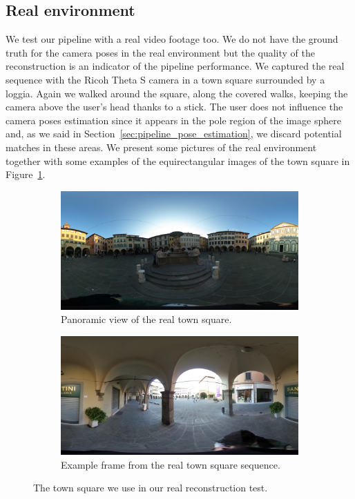 \subsection{Real environment}
We test our pipeline with a real video footage too. We do not have the ground truth
for the camera poses in the real environment but the quality of the
reconstruction is an indicator of the pipeline performance.
We captured the real sequence with the Ricoh Theta S camera in a town square
surrounded by a loggia. Again we walked around the square, along the covered
walks, keeping the camera above the user's head thanks to a stick.
The user does not influence the camera poses estimation since it appears in the
pole region of the image sphere and, as we said in
Section~\ref{sec:pipeline_pose_estimation}, we discard potential matches in
these areas.
We present some pictures of the real environment together with some examples
of the equirectangular images of the town square in
Figure~\ref{fig:piazzaLeoni}.
%
\begin{figure}[h]
\centering
	\begin{subfigure}{0.7\linewidth}
		\centering
		\includegraphics[width=\linewidth]{img/piazzaLeoni.jpg}
		\caption{Panoramic view of the real town square.}
	\end{subfigure}
	\begin{subfigure}{0.7\linewidth}
		\centering
		\includegraphics[width=\linewidth]{img/piazzaLeoni_exampleds.jpg}
		\caption{Example frame from the real town square sequence.}
	\end{subfigure}
\caption{The town square we use in our real reconstruction test.}
\label{fig:piazzaLeoni}
\end{figure}

